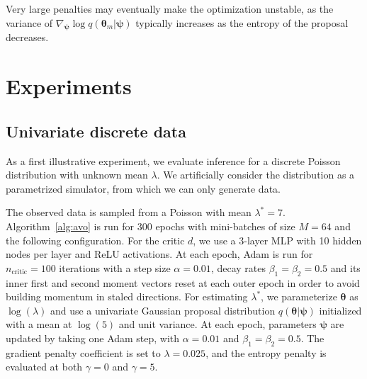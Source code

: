 \documentclass[twocolumn,superscriptaddress,aps]{revtex4-1}
\newcommand{\kcnote}[1]{\textcolor{red}{[KC: #1]}}
\newcommand{\bftheta}{{\bm \theta}}
\newcommand{\bfpsi}{{\bm \psi}}
\theoremstyle{plain}
\begin{document}
Very large penalties may
eventually make the optimization unstable, as the variance of $\nabla_\bfpsi \log q(\bftheta_m|\bfpsi)$
typically increases as the entropy of the proposal decreases.






\section{Experiments}

\subsection{Univariate discrete data}

As a first illustrative experiment, we evaluate inference for a discrete Poisson
distribution with unknown mean $\lambda$. We artificially consider
the distribution as a parametrized simulator, from which we can only
generate data.

The observed data is sampled from a Poisson with mean $\lambda^* = 7$.
Algorithm~\ref{alg:avo} is run for 300 epochs with mini-batches of size $M=64$
and the following configuration. For the critic $d$, we use a 3-layer MLP with 10
hidden nodes per layer and ReLU activations. At each epoch, Adam is run for
$n_\text{critic}=100$ iterations with a step size $\alpha=0.01$, decay rates
$\beta_1=\beta_2=0.5$ and its inner first and second moment vectors reset at
each outer epoch in order to avoid building momentum in staled directions.  For
estimating $\lambda^*$, we parameterize $\bftheta$ as $\log(\lambda)$ and use a univariate Gaussian proposal distribution
$q(\bftheta|\bfpsi)$ initialized with a mean at $\log(5)$ and unit variance. At
each epoch, parameters $\bfpsi$ are updated by taking one Adam step, with
$\alpha=0.01$ and $\beta_1=\beta_2=0.5$. The gradient penalty coefficient is set to
$\lambda=0.025$, and the entropy penalty is evaluated at both $\gamma=0$ and $\gamma=5$.
\end{document}

